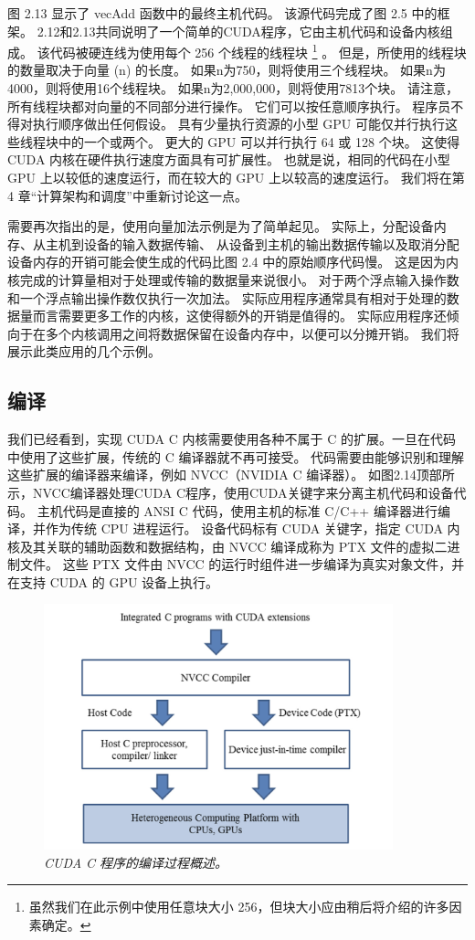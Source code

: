 图 2.13 显示了 vecAdd 函数中的最终主机代码。 该源代码完成了图 2.5 中的框架。 
2.12和2.13共同说明了一个简单的CUDA程序，它由主机代码和设备内核组成。 该代码被硬连线为使用每个 256 个线程的线程块
\footnote{虽然我们在此示例中使用任意块大小 256，但块大小应由稍后将介绍的许多因素确定。} 。 
但是，所使用的线程块的数量取决于向量 (n) 的长度。 如果n为750，则将使用三个线程块。 如果n为4000，则将使用16个线程块。 
如果n为2,000,000，则将使用7813个块。 请注意，所有线程块都对向量的不同部分进行操作。 
它们可以按任意顺序执行。 程序员不得对执行顺序做出任何假设。 
具有少量执行资源的小型 GPU 可能仅并行执行这些线程块中的一个或两个。 更大的 GPU 可以并行执行 64 或 128 个块。 
这使得 CUDA 内核在硬件执行速度方面具有可扩展性。 
也就是说，相同的代码在小型 GPU 上以较低的速度运行，而在较大的 GPU 上以较高的速度运行。 
我们将在第 4 章“计算架构和调度”中重新讨论这一点。

需要再次指出的是，使用向量加法示例是为了简单起见。 
实际上，分配设备内存、从主机到设备的输入数据传输、
从设备到主机的输出数据传输以及取消分配设备内存的开销可能会使生成的代码比图 2.4 中的原始顺序代码慢。 
这是因为内核完成的计算量相对于处理或传输的数据量来说很小。 对于两个浮点输入操作数和一个浮点输出操作数仅执行一次加法。 
实际应用程序通常具有相对于处理的数据量而言需要更多工作的内核，这使得额外的开销是值得的。 
实际应用程序还倾向于在多个内核调用之间将数据保留在设备内存中，以便可以分摊开销。 我们将展示此类应用的几个示例。

\subsection{编译}
我们已经看到，实现 CUDA C 内核需要使用各种不属于 C 的扩展。一旦在代码中使用了这些扩展，传统的 C 编译器就不再可接受。 
代码需要由能够识别和理解这些扩展的编译器来编译，例如 NVCC（NVIDIA C 编译器）。 
如图2.14顶部所示，NVCC编译器处理CUDA C程序，使用CUDA关键字来分离主机代码和设备代码。 
主机代码是直接的 ANSI C 代码，使用主机的标准 C/C++ 编译器进行编译，并作为传统 CPU 进程运行。 
设备代码标有 CUDA 关键字，指定 CUDA 内核及其关联的辅助函数和数据结构，由 NVCC 编译成称为 PTX 文件的虚拟二进制文件。 
这些 PTX 文件由 NVCC 的运行时组件进一步编译为真实对象文件，并在支持 CUDA 的 GPU 设备上执行。

\begin{figure}[H]
	\centering
	\includegraphics[width=0.9\textwidth]{figs/F2.14.png}
	\caption{\textit{CUDA C 程序的编译过程概述。}}
\end{figure}

